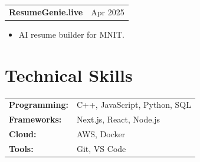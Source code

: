 \documentclass[a4paper,10pt]{article}
\begin{document}
\begin{tabularx}{\linewidth}{ @{}l r@{} }

\textbf{ResumeGenie.live} & \textcolor[HTML]{371e77}{Apr 2025} \\

\end{tabularx}

\vspace{-6pt}

\begin{itemize}[nosep, leftmargin=1.5em]

\item AI resume builder for MNIT.

\end{itemize}




\section{Technical Skills}

\begin{tabularx}{\linewidth}{@{}l X@{}}

\textbf{Programming:} & C++, JavaScript, Python, SQL \\

\textbf{Frameworks:} & Next.js, React, Node.js \\

\textbf{Cloud:} & AWS, Docker \\

\textbf{Tools:} & Git, VS Code \\

\end{tabularx}
\end{document}
